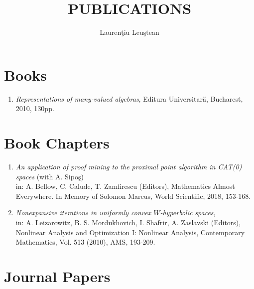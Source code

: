 \documentclass[12pt]{article}
\title{PUBLICATIONS}
\author{Lauren\c tiu Leu\c stean}
\begin{document}
\date{}

\maketitle
\tableofcontents

\section{Books}

\begin{enumerate}
\item {\em Representations of many-valued algebras}, Editura Universitar\u a, Bucharest, 2010, 130pp.
\end{enumerate}


\section{Book Chapters}

\begin{enumerate}
\item {\em An application of proof mining to the proximal point algorithm in CAT(0) spaces} (with  A. Sipo\c s)\\ 
in: A. Bellow, C. Calude, T. Zamfirescu (Editors), Mathematics Almost Everywhere. In Memory of Solomon Marcus, World Scientific, 2018, 153-168.
\item\label{paper-Reich} {\em Nonexpansive iterations in uniformly convex $W$-hyperbolic spaces}, \\
in: A. Leizarowitz, B. S. Mordukhovich, I. Shafrir, A. Zaslavski (Editors),  Nonlinear Analysis and Optimization I: Nonlinear Analysis, Contemporary Mathematics, Vol. 513 (2010), AMS, 193-209.
\end{enumerate}


\section{Journal Papers} \label{journal}
\end{document}
